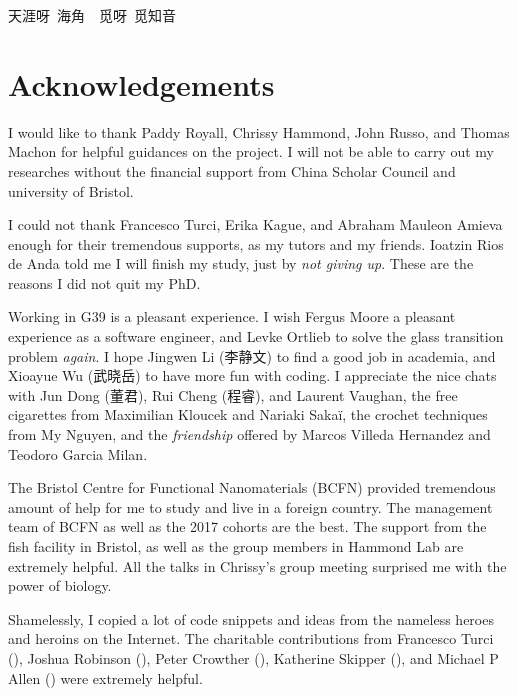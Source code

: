 \documentclass[11pt,twoside]{report}
\begin{document}
{\selectfont 
\Large{天涯呀~海角~~觅呀~觅知音}
}

\cleardoublepage



\cleardoublepage

\chapter*{Acknowledgements}

I would like to thank Paddy Royall, Chrissy Hammond, John Russo, and Thomas Machon for helpful guidances on the project. I will not be able to carry out my researches  without the financial support from China Scholar Council and university of Bristol.


I could not thank Francesco Turci, Erika Kague, and Abraham Mauleon Amieva enough for their tremendous supports, as my tutors and my friends. Ioatzin Rios de Anda told me I will finish my study, just by \emph{not giving up}. These are the reasons I did not quit my PhD.


Working in G39 is a pleasant experience. I wish Fergus Moore a pleasant experience as a software engineer, and Levke Ortlieb to solve the glass transition problem \emph{again}. I hope Jingwen Li (李静文) to find a good job in academia, and Xioayue Wu (武晓岳) to have more fun with coding.
I appreciate the nice chats with Jun Dong (董君), Rui Cheng (程睿), and Laurent Vaughan, the free cigarettes from Maximilian Kloucek and Nariaki Sakaï, the crochet techniques from My Nguyen, and the \emph{friendship} offered by Marcos Villeda Hernandez and Teodoro Garcia Milan.

The Bristol Centre for Functional Nanomaterials (BCFN) provided tremendous amount of help for me to study and live in a foreign country. The management team of BCFN as well as the 2017 cohorts are the best. 
The support from the fish facility in Bristol, as well as the group members in Hammond Lab are extremely helpful. All the talks in Chrissy's group meeting surprised me with the power of biology.


Shamelessly, I copied a lot of code snippets and ideas from the nameless heroes and heroins on the Internet. The charitable contributions from Francesco Turci (), Joshua Robinson (), Peter Crowther (), Katherine Skipper (), and Michael P Allen () were extremely helpful.
\end{document}
